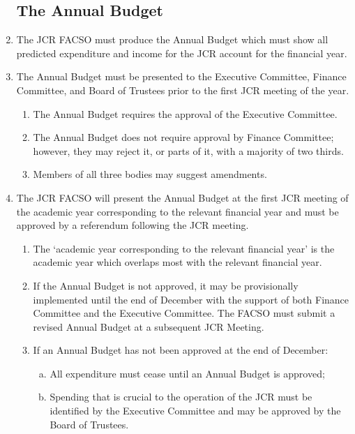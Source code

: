 \documentclass[12pt]{article}
\begin{document}
\begin{enumerate}
    \subsection{The Annual Budget}
    \item The JCR FACSO must produce the Annual Budget which must show all predicted expenditure and income for the JCR account for the financial year.
    \item The Annual Budget must be presented to the Executive Committee, Finance Committee, and Board of Trustees prior to the first JCR meeting of the year.
    \begin{enumerate}
        \item The Annual Budget requires the approval of the Executive Committee.
        \item The Annual Budget does not require approval by Finance Committee; however, they may reject it, or parts of it, with a majority of two thirds. 
        \item Members of all three bodies may suggest amendments.
    \end{enumerate}
    \item The JCR FACSO will present the Annual Budget at the first JCR meeting of the academic year corresponding to the relevant financial year and must be approved by a referendum following the JCR meeting.
    \begin{enumerate}
        \item The `academic year corresponding to the relevant financial year' is the academic year which overlaps most with the relevant financial year.
        \item If the Annual Budget is not approved, it may be provisionally implemented until the end of December with the support of both Finance Committee and the Executive Committee. The FACSO must submit a revised Annual Budget at a subsequent JCR Meeting.
        \item If an Annual Budget has not been approved at the end of December:
        \begin{enumerate}[(a)]
            \item All expenditure must cease until an Annual Budget is approved;
            \item Spending that is crucial to the operation of the JCR must be identified by the Executive Committee and may be approved by the Board of Trustees.
        \end{enumerate}
    \end{enumerate}
    

\end{enumerate}
\end{document}
